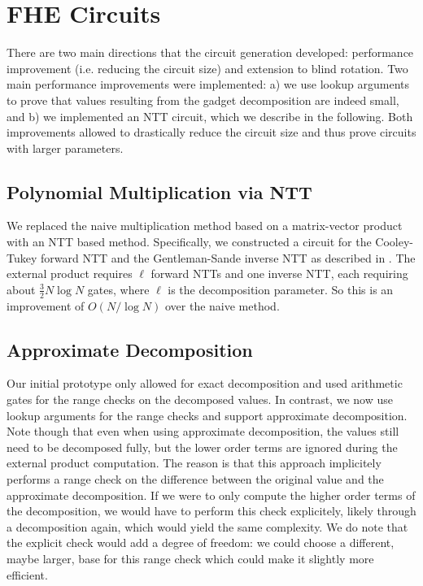 \documentclass{zamarep}
\begin{document}
\section{FHE Circuits}
\label{sec:circuits}

There are two main directions that the circuit generation developed: performance improvement (i.e. reducing the circuit size) and extension to blind rotation. Two main performance improvements were implemented: a) we use lookup arguments to prove that values resulting from the gadget decomposition are indeed small, and b) we implemented an NTT circuit, which we describe in the following. Both improvements allowed to drastically reduce the circuit size and thus prove circuits with larger parameters.

\subsection{Polynomial Multiplication via NTT}
\label{sec:ntt}

We replaced the naive multiplication method based on a matrix-vector product with an NTT based method. Specifically, we constructed a circuit for the Cooley-Tukey forward NTT and the Gentle\-man-Sande inverse NTT as described in \cite{EPRINT:LonNae16}. The external product requires $\ell$ forward NTTs and one inverse NTT, each requiring about $\frac32 N \log N$ gates, where $\ell$ is the decomposition parameter. So this is an improvement of $O(N /\log N)$ over the naive method.

\subsection{Approximate Decomposition}
\label{sec:decomp}

Our initial prototype only allowed for exact decomposition and used arithmetic gates for the range checks on the decomposed values. In contrast, we now use lookup arguments for the range checks and support approximate decomposition. Note though that even when using approximate decomposition, the values still need to be decomposed fully, but the lower order terms are ignored during the external product computation. The reason is that this approach implicitely performs a range check on the difference between the original value and the approximate decomposition. If we were to only compute the higher order terms of the decomposition, we would have to perform this check explicitely, likely through a decomposition again, which would yield the same complexity. We do note that the explicit check would add a degree of freedom: we could choose a different, maybe larger, base for this range check which could make it slightly more efficient.
\end{document}

